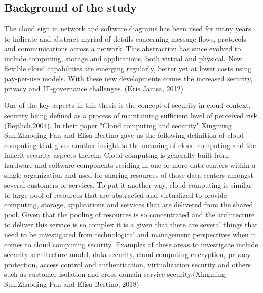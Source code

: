 \documentclass{article}
\begin{document}
\subsection{Background of the study}
The cloud sign in network and software diagrams has been used for many years to indicate and abstract myriad of details concerning message flows, protocols and communications across a network. This abstraction has since evolved to include computing, storage and applications, both virtual and physical. New flexible cloud capabilities are emerging regularly, better yet at lower costs using pay-per-use models. With these new developments comes the increased security, privacy and IT-governance challenges. (Kris Jamsa, 2012)
\par
One of the key aspects in this thesis is the concept of security in cloud context, security being defined as a process of maintaining sufficient level of perceived risk.(Bejtlich,2004).
In their paper "Cloud computing and security" Xingming Sun,Zhaoqing Pan and Elisa Bertino gave us the following definition of cloud computing that gives another insight to the meaning of cloud computing and the inherit security aspects therein: Cloud computing is generally built from hardware and software components residing in one or more data centers within a single organization and used for sharing resources of those data centers amongst several customers or services. To put it another way, cloud computing is similar to large pool of resources that are abstracted and virtualized to provide computing, storage, applications and services that are delivered from the shared pool. Given that the pooling of resources is so concentrated and the architecture to deliver this service is so complex it is a given that there are several things that need to be investigated from technological and management perspectives when it comes to cloud computing security. Examples of these areas to investigate include security architecture model, data security, cloud computing encryption, privacy protection, access control and authentication, virtualization security and others such as customer isolation and cross-domain service security.(Xingming Sun,Zhaoqing Pan and Elisa Bertino, 2018)
\par 
\end{document}

